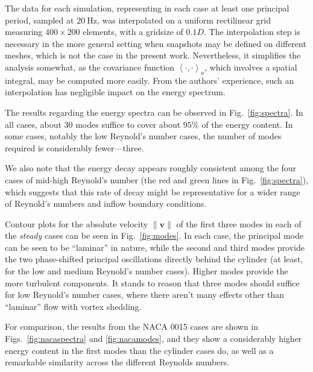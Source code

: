 \documentclass[3p,times,procedia]{elsarticle}
\begin{document}
The data for each simulation, representing in each case at least one principal
period, sampled at $\SI{20}{\hertz}$, was interpolated on a uniform rectilinear
grid measuring $400 \times 200$ elements, with a gridsize of $0.1D$. The
interpolation step is necessary in the more general setting when snapshots may
be defined on different meshes, which is not the case in the present work.
Nevertheless, it simplifies the analysis somewhat, as the covariance function
$\left< \cdot, \cdot \right>_a$, which involves a spatial integral, may be
computed more easily. From the authors' experience, such an interpolation has
negligible impact on the energy spectrum.

The results regarding the energy spectra can be observed in
Fig.~\ref{fig:spectra}. In all cases, about 30 modes suffice to cover about
$95$\% of the energy content. In some cases, notably the low Reynold's number
cases, the number of modes required is considerably fewer---three.

We also note that the energy decay appears roughly consistent among the four
cases of mid-high Reynold's number (the red and green lines in
Fig.~\ref{fig:spectra}), which suggests that this rate of decay might be
representative for a wider range of Reynold's numbers and inflow boundary
conditions.

Contour plots for the absolute velocity $\|\bm v\|$ of the first three modes in
each of the \emph{steady} cases can be seen in Fig.~\ref{fig:modes}. In each
case, the principal mode can be seen to be ``laminar'' in nature, while the
second and third modes provide the two phase-shifted principal oscillations
directly behind the cylinder (at least, for the low and medium Reynold's number
cases). Higher modes provide the more turbulent components. It stands to reason
that three modes should suffice for low Reynold's number cases, where there
aren't many effects other than ``laminar'' flow with vortex shedding.

For comparison, the results from the NACA 0015 cases are shown in
Figs.~\ref{fig:nacaspectra} and \ref{fig:nacamodes}, and they show a
considerably higher energy content in the first modes than the cylinder cases
do, as well as a remarkable similarity across the different Reynolds numbers.
\end{document}

